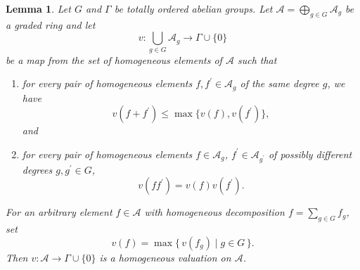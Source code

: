 \documentclass[12pt,twoside,a4paper]{article}
\newtheorem{lemma}[thm]{Lemma}
\theoremstyle{definition}
\theoremstyle{remark}
\begin{document}
\begin{lemma}\label{Gauss Lemma}Let $G$ and $\Gamma$ be totally ordered abelian groups. Let $\mathcal{A}=\bigoplus_{g\in G}\mathcal{A}_{g}$ be a graded ring and let \begin{equation*}v: \bigcup_{g\in G}\mathcal{A}_{g}\to \Gamma\cup\{0\}\end{equation*}be a map from the set of homogeneous elements of $\mathcal{A}$ such that \begin{enumerate}[(1)]\item for every pair of homogeneous elements $f, f^{\prime}\in \mathcal{A}_{g}$ of the same degree $g$, we have \begin{equation*}v(f+f^{\prime})\leq \max\{v(f), v(f^{\prime})\},\end{equation*}and \item for every pair of homogeneous elements $f\in \mathcal{A}_{g}$, $f^{\prime}\in \mathcal{A}_{g^{\prime}}$ of possibly different degrees $g, g^{\prime}\in G$, \begin{equation*}v(ff^{\prime})=v(f)v(f^{\prime}).\end{equation*}\end{enumerate}For an arbitrary element $f\in \mathcal{A}$ with homogeneous decomposition $f=\sum_{g\in G}f_{g}$, set \begin{equation*}v(f)=\max\{\, v(f_{g})\mid g\in G\,\}.\end{equation*}Then $v: \mathcal{A}\to \Gamma\cup\{0\}$ is a homogeneous valuation on $\mathcal{A}$. \end{lemma}
\end{document}
